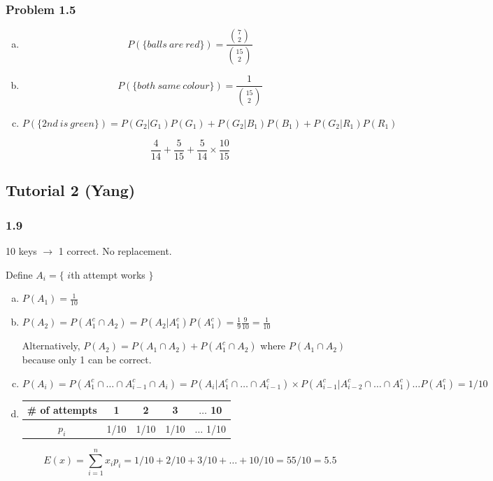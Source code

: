 \documentclass{article}
\begin{document}
\subsubsection*{Problem 1.5}

\begin{enumerate}[(a)]

\item $$P(\{ balls\ are\ red\}) = \frac{{7 \choose 2}}{{15 \choose 2}}$$

\item $$P(\{ both\ same\ colour\}) = \frac{1}{{15 \choose 2}}$$

\item $$P(\{ 2nd\ is\ green\})  = P(G_2 | G_1)P(G_1) + P(G_2|B_1)P(B_1) + P(G_2|R_1)P(R_1)$$

$$\frac{4}{14} + \frac{5}{15} + \frac{5}{14} \times \frac{10}{15}$$

\end{enumerate}



\subsection{Tutorial 2 (Yang)}

\subsubsection*{1.9}

10 keys $\rightarrow$ 1 correct. No replacement.

Define $A_i = \{ $ $i$th attempt works $\}$

\begin{enumerate}[(a)]
\item $P(A_1) = \frac{1}{10}$
\item $P(A_2) = P(A_1^c \cap A_2) = P(A_2|A_1^c) P(A_1^c) = \frac{1}{9} \frac{9}{10} = \frac{1}{10}$

Alternatively, $P(A_2) = P(A_1 \cap A_2) + P(A_1^c \cap A_2)$ where $P(A_1 \cap A_2)$ because only 1 can be correct.

\item $P(A_i) = P(A_1^c \cap \dots \cap A_{i-1}^c \cap A_i) = P(A_i | A_1^c \cap \dots \cap A_{i-1}^c) \times P(A_{i-1}^c | A_{i-2}^c \cap \dots \cap A_{1}^c) \dots P(A_1^c) = 1/10$

\item 

\begin{table}[H]
\centering
\begin{tabular}{c|cccc}
\toprule
\# of attempts & 1 & 2 & 3 & $\dots$ 10 \\
\midrule
$p_i$ & 1/10 & 1/10 & 1/10 & $\dots$ 1/10 \\
\bottomrule
\end{tabular}
\end{table}

$$
E(x) = \sum_{i=1}^n x_i p_i = 1/10 + 2/10 + 3/10 + \dots + 10/10 = 55/10 = 5.5
$$



\end{enumerate}
\end{document}
